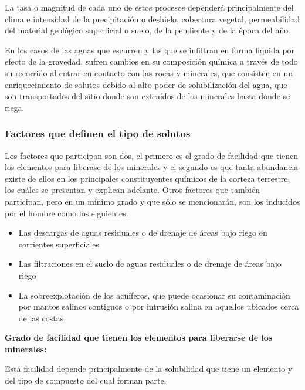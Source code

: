 La tasa o magnitud de cada uno de estos procesos dependerá principalmente del clima e intensidad de la precipitación o deshielo, cobertura vegetal, permeabilidad del material geológico superficial o suelo, de la pendiente y de la época del año.

En los casos de las aguas que escurren y las que se infiltran en forma líquida por efecto de la gravedad, sufren cambios en su composición química a través de todo su recorrido al entrar en contacto con las rocas y minerales, que consisten en un enriquecimiento de solutos debido al alto poder de solubilización del agua, que son transportados del sitio donde son extraídos de los minerales hasta donde se riega.

\subsubsection{Factores que definen el tipo de solutos}
Los factores que participan son dos, el primero es el grado de facilidad que tienen
los elementos para liberase de los minerales y el segundo es que tanta abundancia
existe de ellos en los principales constituyentes químicos de la corteza terrestre, los
cuáles se presentan y explican adelante.
Otros factores que también participan, pero en un mínimo grado y que sólo se
mencionarán, son los inducidos por el hombre como los siguientes.
\begin{itemize}
  \item Las descargas de aguas residuales o de drenaje de áreas bajo riego en corrientes superficiales
  \item Las filtraciones en el suelo de aguas residuales o de drenaje de áreas bajo riego
  \item La sobreexplotación de los acuíferos, que puede ocasionar su contaminación por mantos salinos contiguos o por intrusión salina en aquellos ubicados cerca de las costas.
\end{itemize}

\textbf{ Grado de facilidad que tienen los elementos para liberarse de los minerales:}

Esta facilidad depende principalmente de la solubilidad que tiene un elemento y del tipo de compuesto del cual forman parte.

